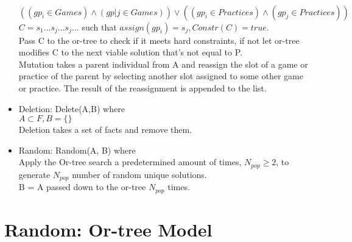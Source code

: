 \documentclass[12 pt]{article}        	%
\begin{document}
\begin{itemize}
\\ $((gp_i \in Games) \land (gp|j \in Games)) \lor ((gp_i \in Practices) \land (gp_j \in Practices))$
\\ $C = s_1 ... s_j ... s_j ...$ such that $assign(gp_i) = s_j, Constr(C) = true$.
\\Pass C to the or-tree to check if it meets hard constraints, if not let or-tree modifies C to the next
viable solution that’s not equal to P.
\\Mutation takes a parent individual from A and reassign the slot of a game or
practice of the parent by selecting another slot assigned to some other game or
practice. The result of the reassignment is appended to the list.
\item Deletion: Delete(A,B) where
\\ $A \subset F, B = \{\}$
\\Deletion takes a set of facts and remove them.
\item Random: Random(A, B) where
\\ Apply the Or-tree search a predetermined amount of times, $N_{pop} \ge 2$, to generate $N_{pop}$ number of
random unique solutions.
\\ B = A passed down to the or-tree $N_{pop}$ times.
\end{itemize}

\section{Random: Or-tree Model}
\end{document}
